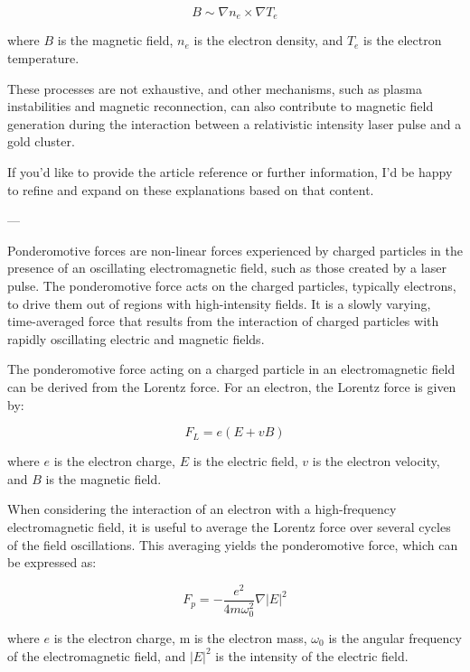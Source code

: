 \begin{equation}
    B \sim \nabla n_e \times \nabla T_e
\end{equation}

where $B$ is the magnetic field, $n_e$ is the electron density, and $T_e$ is the electron temperature.

These processes are not exhaustive, and other mechanisms, such as plasma instabilities and magnetic reconnection, can also contribute to magnetic field generation during the interaction between a relativistic intensity laser pulse and a gold cluster.

If you'd like to provide the article reference or further information, I'd be happy to refine and expand on these explanations based on that content.

---

Ponderomotive forces are non-linear forces experienced by charged particles in the presence of an oscillating electromagnetic field, such as those created by a laser pulse. The ponderomotive force acts on the charged particles, typically electrons, to drive them out of regions with high-intensity fields. It is a slowly varying, time-averaged force that results from the interaction of charged particles with rapidly oscillating electric and magnetic fields.

The ponderomotive force acting on a charged particle in an electromagnetic field can be derived from the Lorentz force. For an electron, the Lorentz force is given by:

\begin{equation}
    F_L = e \left( E + vB \right)
\end{equation}

where $e$ is the electron charge, $E$ is the electric field, $v$ is the electron velocity, and $B$ is the magnetic field.

When considering the interaction of an electron with a high-frequency electromagnetic field, it is useful to average the Lorentz force over several cycles of the field oscillations. This averaging yields the ponderomotive force, which can be expressed as:

\begin{equation}
    F_p = - \frac{e^2}{4 m \omega_0^2} \nabla |E|^2
\end{equation}

where $e$ is the electron charge, m is the electron mass, $\omega_0$ is the angular frequency of the electromagnetic field, and $|E|^2$ is the intensity of the electric field.

